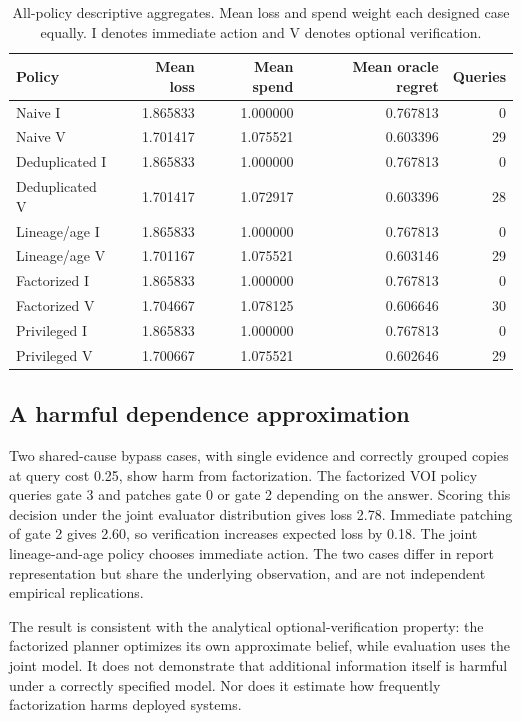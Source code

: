 \documentclass[manuscript,screen,nonacm]{acmart}
\begin{document}
\begin{table}[t]
\caption{All-policy descriptive aggregates. Mean loss and spend weight each designed case equally. I denotes immediate action and V denotes optional verification.}
\label{tab:policies}
\begin{tabular}{lrrrr}
\toprule Policy & Mean loss & Mean spend & Mean oracle regret & Queries \\
\midrule
Naive I &1.865833&1.000000&0.767813&0\\
Naive V &1.701417&1.075521&0.603396&29\\
Deduplicated I &1.865833&1.000000&0.767813&0\\
Deduplicated V &1.701417&1.072917&0.603396&28\\
Lineage/age I &1.865833&1.000000&0.767813&0\\
Lineage/age V &1.701167&1.075521&0.603146&29\\
Factorized I &1.865833&1.000000&0.767813&0\\
Factorized V &1.704667&1.078125&0.606646&30\\
Privileged I &1.865833&1.000000&0.767813&0\\
Privileged V &1.700667&1.075521&0.602646&29\\
\bottomrule
\end{tabular}
\end{table}

\subsection{A harmful dependence approximation}
Two shared-cause bypass cases, with single evidence and correctly grouped copies at query cost 0.25, show harm from factorization. The factorized VOI policy queries gate 3 and patches gate 0 or gate 2 depending on the answer. Scoring this decision under the joint evaluator distribution gives loss 2.78. Immediate patching of gate 2 gives 2.60, so verification increases expected loss by 0.18. The joint lineage-and-age policy chooses immediate action. The two cases differ in report representation but share the underlying observation, and are not independent empirical replications.

The result is consistent with the analytical optional-verification property: the factorized planner optimizes its own approximate belief, while evaluation uses the joint model. It does not demonstrate that additional information itself is harmful under a correctly specified model. Nor does it estimate how frequently factorization harms deployed systems.
\end{document}

